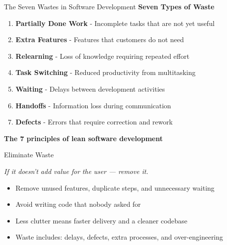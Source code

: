 \documentclass{thapathali}
\begin{document}
\begin{frame}{The Seven Wastes in Software Development}
    \textbf{Seven Types of Waste}
    \vspace{0.4em}
    
    \begin{enumerate}
        \item \textbf{Partially Done Work} - Incomplete tasks that are not yet useful
        \item \textbf{Extra Features} - Features that customers do not need
        \item \textbf{Relearning} - Loss of knowledge requiring repeated effort
        \item \textbf{Task Switching} - Reduced productivity from multitasking
        \item \textbf{Waiting} - Delays between development activities
        \item \textbf{Handoffs} - Information loss during communication
        \item \textbf{Defects} - Errors that require correction and rework
    \end{enumerate}
\end{frame}


\begin{frame}[plain]
    \begin{center}
        \vspace{2cm}
        {\Large \bfseries The 7 principles of lean software development}
    \end{center}
\end{frame}

\begin{frame}{Eliminate Waste}
    \begin{center}
        \textit{If it doesn't add value for the user --- remove it.}
    \end{center}
    \vspace{0.8em}
    
    \begin{itemize}
        \item Remove unused features, duplicate steps, and unnecessary waiting
        \item Avoid writing code that nobody asked for
        \item Less clutter means faster delivery and a cleaner codebase
        \item Waste includes: delays, defects, extra processes, and over-engineering
    \end{itemize}
\end{frame}
\end{document}
